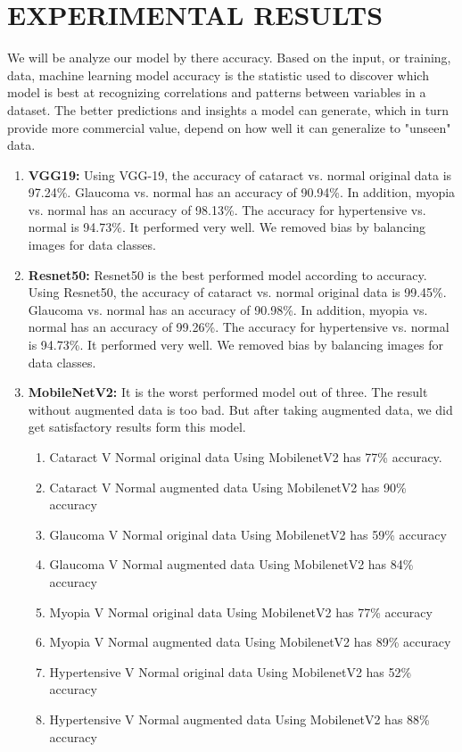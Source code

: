 \chapter{EXPERIMENTAL RESULTS}
We will be analyze our model by there accuracy. Based on the input, or training, data, machine learning model accuracy is the statistic used to discover which model is best at recognizing correlations and patterns between variables in a dataset. The better predictions and insights a model can generate, which in turn provide more commercial value, depend on how well it can generalize to "unseen" data.
\vspace{5pt}
\begin{enumerate}
    \item \textbf{VGG19:} Using VGG-19, the accuracy of cataract vs. normal original data is 97.24\%. Glaucoma vs. normal has an accuracy of 90.94\%. In addition, myopia vs. normal has an accuracy of 98.13\%. The accuracy for hypertensive vs. normal is 94.73\%. It performed very well. We removed bias by balancing images for data classes.
    \vspace{5pt}
    \item \textbf{Resnet50:} Resnet50 is the best performed model according to accuracy. Using Resnet50, the accuracy of cataract vs. normal original data is 99.45\%. Glaucoma vs. normal has an accuracy of 90.98\%. In addition, myopia vs. normal has an accuracy of 99.26\%. The accuracy for hypertensive vs. normal is 94.73\%. It performed very well. We removed bias by balancing images for data classes.
    \vspace{5pt}
     \item \textbf{MobileNetV2:} It is the worst performed model out of three. The result without augmented data is too bad. But after taking augmented data, we did get satisfactory results form this model.
     \begin{enumerate}
         \item Cataract V Normal original data Using MobilenetV2 has 77\% accuracy.
         \item Cataract V Normal augmented data Using MobilenetV2 has 90\% accuracy 
         \item Glaucoma V Normal original data Using MobilenetV2 has 59\% accuracy 
         \item Glaucoma V Normal augmented data Using MobilenetV2 has 84\% accuracy 
         \item Myopia V Normal original data Using MobilenetV2 has 77\% accuracy 
         \item Myopia V Normal augmented data Using MobilenetV2 has 89\% accuracy 
         \item Hypertensive V Normal original data Using MobilenetV2 has 52\% accuracy 
         \item Hypertensive V Normal augmented data Using MobilenetV2 has 88\% accuracy 
     \end{enumerate}
\end{enumerate}
